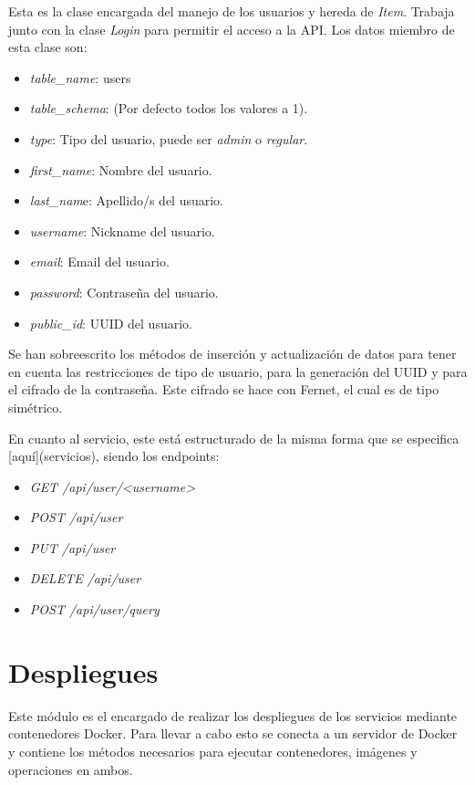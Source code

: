 Esta es la clase encargada del manejo de los usuarios y hereda de \textit{Item}. Trabaja junto con la clase \textit{Login} para permitir el acceso a la API. Los datos miembro de esta clase son:
\begin{itemize}
	\item \textit{table\_name}: users
	\item \textit{table\_schema}: (Por defecto todos los valores a 1).
	\item \textit{type}: Tipo del usuario, puede ser \textit{admin} o \textit{regular}.
	\item \textit{first\_name}: Nombre del usuario.
	\item \textit{last\_nam}e: Apellido/s del usuario.
	\item \textit{username}: Nickname del usuario.
	\item \textit{email}: Email del usuario.
	\item \textit{password}: Contraseña del usuario.
	\item \textit{public\_id}: UUID del usuario.
\end{itemize}


\bigskip
Se han sobreescrito los métodos de inserción y actualización de datos para tener en cuenta las restricciones de tipo de usuario, para la generación del UUID y para el cifrado de la contraseña. Este cifrado se hace con Fernet, el cual es de tipo simétrico.

\bigskip
En cuanto al servicio, este está estructurado de la misma forma que se especifica [aquí](servicios), siendo los endpoints:
\begin{itemize}
	\item \textit{GET /api/user/<username>}
	\item \textit{POST /api/user}
	\item \textit{PUT /api/user}
	\item \textit{DELETE /api/user}
	\item \textit{POST /api/user/query}
\end{itemize}




\section{Despliegues}

Este módulo es el encargado de realizar los despliegues de los servicios mediante contenedores Docker. Para llevar a cabo esto se conecta a un servidor de Docker y contiene los métodos necesarios para ejecutar contenedores, imágenes y operaciones en ambos.

